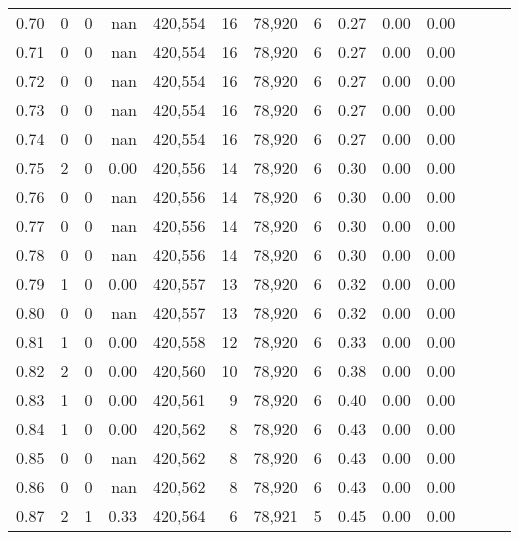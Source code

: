 \begin{tabular}{rrrrrrrrrrrrrr}
0.70 &       0 &      0 &   nan &  420,554 &       16 &  78,920 &       6 &  0.27 &  0.00 &      0.00 \\
0.71 &       0 &      0 &   nan &  420,554 &       16 &  78,920 &       6 &  0.27 &  0.00 &      0.00 \\
0.72 &       0 &      0 &   nan &  420,554 &       16 &  78,920 &       6 &  0.27 &  0.00 &      0.00 \\
0.73 &       0 &      0 &   nan &  420,554 &       16 &  78,920 &       6 &  0.27 &  0.00 &      0.00 \\
0.74 &       0 &      0 &   nan &  420,554 &       16 &  78,920 &       6 &  0.27 &  0.00 &      0.00 \\
0.75 &       2 &      0 &  0.00 &  420,556 &       14 &  78,920 &       6 &  0.30 &  0.00 &      0.00 \\
0.76 &       0 &      0 &   nan &  420,556 &       14 &  78,920 &       6 &  0.30 &  0.00 &      0.00 \\
0.77 &       0 &      0 &   nan &  420,556 &       14 &  78,920 &       6 &  0.30 &  0.00 &      0.00 \\
0.78 &       0 &      0 &   nan &  420,556 &       14 &  78,920 &       6 &  0.30 &  0.00 &      0.00 \\
0.79 &       1 &      0 &  0.00 &  420,557 &       13 &  78,920 &       6 &  0.32 &  0.00 &      0.00 \\
0.80 &       0 &      0 &   nan &  420,557 &       13 &  78,920 &       6 &  0.32 &  0.00 &      0.00 \\
0.81 &       1 &      0 &  0.00 &  420,558 &       12 &  78,920 &       6 &  0.33 &  0.00 &      0.00 \\
0.82 &       2 &      0 &  0.00 &  420,560 &       10 &  78,920 &       6 &  0.38 &  0.00 &      0.00 \\
0.83 &       1 &      0 &  0.00 &  420,561 &        9 &  78,920 &       6 &  0.40 &  0.00 &      0.00 \\
0.84 &       1 &      0 &  0.00 &  420,562 &        8 &  78,920 &       6 &  0.43 &  0.00 &      0.00 \\
0.85 &       0 &      0 &   nan &  420,562 &        8 &  78,920 &       6 &  0.43 &  0.00 &      0.00 \\
0.86 &       0 &      0 &   nan &  420,562 &        8 &  78,920 &       6 &  0.43 &  0.00 &      0.00 \\
0.87 &       2 &      1 &  0.33 &  420,564 &        6 &  78,921 &       5 &  0.45 &  0.00 &      0.00 \\

\end{tabular}

